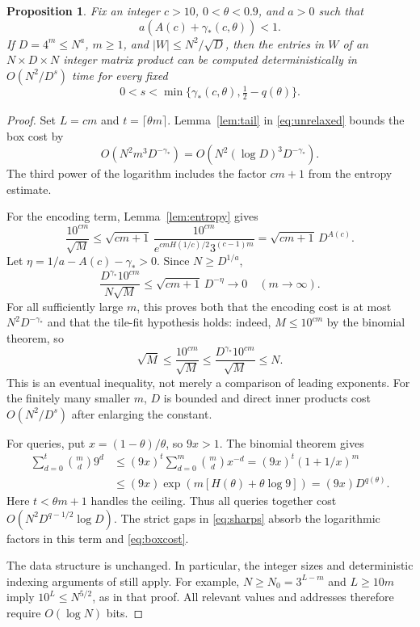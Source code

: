 \documentclass[11pt,a4paper]{article}
\newtheorem{proposition}[theorem]{Proposition}
\theoremstyle{remark}
\newcommand{\gam}{\gamma_{\!*}}
\begin{document}
\begin{proposition}\label{prop:inner}
Fix an integer $c>10$, $0<\theta<0.9$, and $a>0$ such that
\begin{equation}\label{eq:admissible}
 a(A(c)+\gam(c,\theta))<1.
\end{equation}
If $D=4^m\leq N^a$, $m\geq1$, and $|W|\leq N^2/\sqrt D$, then the
entries in $W$ of an $N\times D\times N$ integer matrix product can be
computed deterministically in $O(N^2/D^s)$ time for every fixed
\begin{equation}\label{eq:sharps}
 0<s<\min\{\gam(c,\theta),\tfrac12-q(\theta)\}.
\end{equation}
\end{proposition}
\begin{proof}
Set $L=cm$ and $t=\lceil\theta m\rceil$. Lemma~\ref{lem:tail} in
\eqref{eq:unrelaxed} bounds the box cost by
\begin{equation}\label{eq:boxcost}
 O(N^2m^3D^{-\gam})=O(N^2(\log D)^3D^{-\gam}).
\end{equation}
The third power of the logarithm includes the factor $cm+1$ from the
entropy estimate.

For the encoding term, Lemma~\ref{lem:entropy} gives
\begin{equation}\label{eq:encodingbound}
 \frac{10^{cm}}{\sqrt M}
 \leq\sqrt{cm+1}\,
 \frac{10^{cm}}{e^{cmH(1/c)/2}3^{(c-1)m}}
 =\sqrt{cm+1}\,D^{A(c)}.
\end{equation}
Let $\eta=1/a-A(c)-\gam>0$. Since $N\geq D^{1/a}$,
\[
 \frac{D^{\gam}10^{cm}}{N\sqrt M}
 \leq\sqrt{cm+1}\,D^{-\eta}\longrightarrow0
 \quad(m\longrightarrow\infty).
\]
For all sufficiently large $m$, this proves both that the encoding cost is
at most $N^2D^{-\gam}$ and that the tile-fit hypothesis holds: indeed,
$M\leq10^{cm}$ by the binomial theorem, so
\[
 \sqrt M\leq\frac{10^{cm}}{\sqrt M}
 \leq\frac{D^{\gam}10^{cm}}{\sqrt M}\leq N.
\]
This is an eventual inequality, not merely a comparison of leading
exponents. For the finitely many smaller $m$, $D$ is bounded and direct
inner products cost $O(N^2/D^s)$ after enlarging the constant.

For queries, put $x=(1-\theta)/\theta$, so $9x>1$. The binomial theorem gives
\begin{align*}
 \sum_{d=0}^t\binom md9^d
 &\leq(9x)^t\sum_{d=0}^m\binom md x^{-d}
 =(9x)^t(1+1/x)^m\\
 &\leq(9x)\exp\!\left(m[H(\theta)+\theta\log9]\right)
 =(9x)D^{q(\theta)}.
\end{align*}
Here $t<\theta m+1$ handles the ceiling. Thus all queries together cost
$O(N^2D^{q-1/2}\log D)$. The strict gaps in \eqref{eq:sharps} absorb the
logarithmic factors in this term and \eqref{eq:boxcost}.

The data structure is unchanged. In particular, the integer sizes and
deterministic indexing arguments of \cite[Theorem 30]{AVW} still apply.
For example, $N\geq N_0=3^{L-m}$ and $L\geq10m$ imply
$10^L\leq N^{5/2}$, as in that proof. All relevant values and addresses
therefore require $O(\log N)$ bits.
\end{proof}
\end{document}
